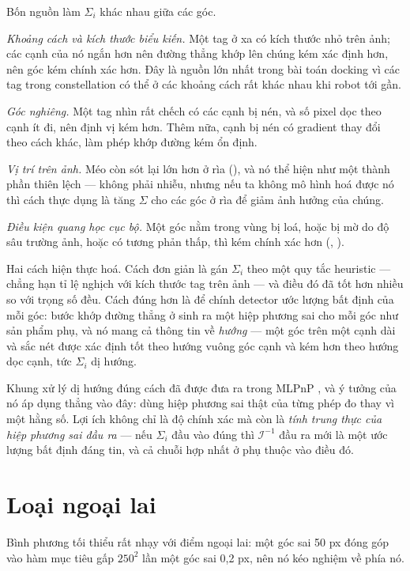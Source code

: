 \documentclass[../../marker.tex]{subfiles}
\begin{document}
Bốn nguồn làm \(\Sigma_i\) khác nhau giữa các góc.

\emph{Khoảng cách và kích thước biểu kiến.} Một tag ở xa có kích thước nhỏ trên ảnh; các cạnh của nó ngắn hơn nên đường thẳng khớp lên chúng kém xác định hơn, nên góc kém chính xác hơn. Đây là nguồn lớn nhất trong bài toán docking vì các tag trong constellation có thể ở các khoảng cách rất khác nhau khi robot tới gần.

\emph{Góc nghiêng.} Một tag nhìn rất chếch có các cạnh bị nén, và số pixel dọc theo cạnh ít đi, nên định vị kém hơn. Thêm nữa, cạnh bị nén có gradient thay đổi theo cách khác, làm phép khớp đường kém ổn định.

\emph{Vị trí trên ảnh.} Méo còn sót lại lớn hơn ở rìa (), và nó thể hiện như một thành phần thiên lệch --- không phải nhiễu, nhưng nếu ta không mô hình hoá được nó thì cách thực dụng là tăng \(\Sigma\) cho các góc ở rìa để giảm ảnh hưởng của chúng.

\emph{Điều kiện quang học cục bộ.} Một góc nằm trong vùng bị loá, hoặc bị mờ do độ sâu trường ảnh, hoặc có tương phản thấp, thì kém chính xác hơn (, ).

Hai cách hiện thực hoá. Cách đơn giản là gán \(\Sigma_i\) theo một quy tắc heuristic --- chẳng hạn tỉ lệ nghịch với kích thước tag trên ảnh --- và điều đó đã tốt hơn nhiều so với trọng số đều. Cách đúng hơn là để chính detector ước lượng bất định của mỗi góc: bước khớp đường thẳng ở  sinh ra một hiệp phương sai cho mỗi góc như sản phẩm phụ, và nó mang cả thông tin về \emph{hướng} --- một góc trên một cạnh dài và sắc nét được xác định tốt theo hướng vuông góc cạnh và kém hơn theo hướng dọc cạnh, tức \(\Sigma_i\) dị hướng.

Khung xử lý dị hướng đúng cách đã được đưa ra trong MLPnP \cite{urban2016mlpnp}, và ý tưởng của nó áp dụng thẳng vào đây: dùng hiệp phương sai thật của từng phép đo thay vì một hằng số. Lợi ích không chỉ là độ chính xác mà còn là \emph{tính trung thực của hiệp phương sai đầu ra} --- nếu \(\Sigma_i\) đầu vào đúng thì \(\mathcal{I}^{-1}\) đầu ra mới là một ước lượng bất định đáng tin, và cả chuỗi hợp nhất ở  phụ thuộc vào điều đó.

\section{Loại ngoại lai}

Bình phương tối thiểu rất nhạy với điểm ngoại lai: một góc sai 50 px đóng góp vào hàm mục tiêu gấp \(250^2\) lần một góc sai 0,2 px, nên nó kéo nghiệm về phía nó.
\end{document}
